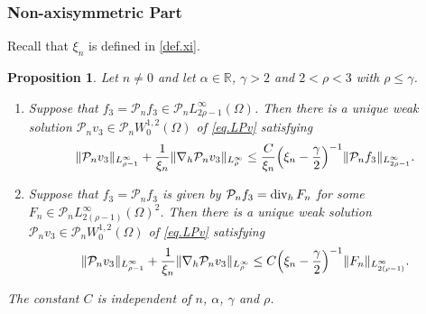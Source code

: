 \documentclass[11pt,a4paper]{article}
\numberwithin{equation}{section}
\newtheorem{proposition}[theorem]{Proposition}
{\theorembodyfont{\rmfamily}\newtheorem{remark}[theorem]{Remark}}
{\theorembodyfont{\rmfamily}\newtheorem{remarks}[theorem]{Remarks}}
\newcommand{\R}{\mathbb{R}}
\newcommand{\opdiv}{\operatorname{div}}
\newcommand{\h}{{\rm h}}
\begin{document}
\subsubsection{Non-axisymmetric Part}
\label{subsubsec.nonaxisym.vert}


Recall that $\xi_n$ is defined in \eqref{def.xi}. 
%
\begin{proposition}\label{prop.LPz.nonzero}
Let $n\neq0$ and let $\alpha\in\R$, $\gamma>2$ and $2<\rho<3$ with $\rho\le\gamma$. 


%
\begin{enumerate}[(1)]
\item\label{item1.prop.LPz.nonzero}
Suppose that $f_3={\mathcal P}_n f_3\in {\mathcal P}_n L^\infty_{2\rho-1}(\Omega)$. Then there is a unique weak solution ${\mathcal P}_n v_3\in {\mathcal P}_n W^{1,2}_0(\Omega)$ of \eqref{eq.LPv} satisfying 
%
\begin{align}\label{est1.prop.LPz.nonzero}
\|{\mathcal P}_n v_3\|_{L^\infty_{\rho-1}} 
+ \frac{1}{\xi_n} \|\nabla_\h {\mathcal P}_n v_3\|_{L^\infty_{\rho}} 
\le 
\frac{C}{\xi_n} \Big(\xi_n - \frac{\gamma}2\Big)^{-1} 
\|{\mathcal P}_n f_3\|_{L^\infty_{2\rho-1}}. 
\end{align}
%


\item\label{item2.prop.LPz.nonzero}
Suppose that $f_3={\mathcal P}_n f_3$ is given by ${\mathcal P}_n f_3=\opdiv_\h F_n$ for some $F_n\in {\mathcal P}_n L^\infty_{2(\rho-1)}(\Omega)^2$. Then there is a unique weak solution ${\mathcal P}_n v_3\in {\mathcal P}_n W^{1,2}_0(\Omega)$ of \eqref{eq.LPv} satisfying 
%
\begin{align}\label{est2.prop.LPz.nonzero}
\|{\mathcal P}_n v_3\|_{L^\infty_{\rho-1}} 
+ \frac{1}{\xi_n} \|\nabla_\h {\mathcal P}_n v_3\|_{L^\infty_{\rho}} 
\le 
C \Big(\xi_n - \frac{\gamma}2\Big)^{-1} 
\|F_n\|_{L^\infty_{2(\rho-1)}}. 
\end{align}
%
\end{enumerate}
%
The constant $C$ is independent of $n$, $\alpha$, $\gamma$ and $\rho$.
\end{proposition}
%
%
\end{document}
